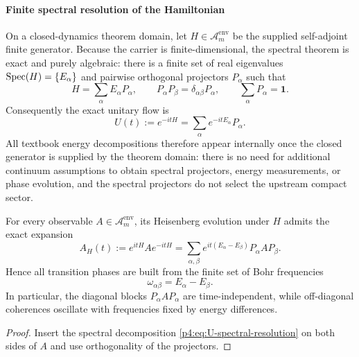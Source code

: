 \documentclass[12pt,a4paper]{article}
\begin{document}
\paragraph{Finite spectral resolution of the Hamiltonian}
\label{p4:sec:part2-spectral-resolution}

On a closed-dynamics theorem domain, let $H\in\mathcal A_m^{\mathrm{env}}$ be the supplied self-adjoint finite generator.
Because the carrier is finite-dimensional, the spectral theorem is exact and purely algebraic: there is a finite set of real eigenvalues $\operatorname{Spec}(H)=\{E_\alpha\}$ and pairwise orthogonal projectors $P_\alpha$ such that
\begin{equation}
\label{p4:eq:H-spectral-resolution}
H=\sum_{\alpha} E_\alpha P_\alpha,
\qquad
P_\alpha P_\beta=\delta_{\alpha\beta}P_\alpha,
\qquad
\sum_\alpha P_\alpha=\mathbf 1.
\end{equation}
Consequently the exact unitary flow is
\begin{equation}
\label{p4:eq:U-spectral-resolution}
U(t):=e^{-itH}=\sum_\alpha e^{-itE_\alpha}P_\alpha.
\end{equation}
All textbook energy decompositions therefore appear internally once the closed generator is supplied by the theorem domain: there is no need for additional continuum assumptions to obtain spectral projectors, energy measurements, or phase evolution, and the spectral projectors do not select the upstream compact sector.


\begin{theorem}
\label{p4:thm:finite-spectral-evolution}
For every observable $A\in\mathcal A_m^{\mathrm{env}}$, its Heisenberg evolution under $H$ admits the exact expansion
\begin{equation}
\label{p4:eq:A-heis-bohr}
A_H(t):=e^{itH}Ae^{-itH}=\sum_{\alpha,\beta} e^{it(E_\alpha-E_\beta)}P_\alpha A P_\beta.
\end{equation}
Hence all transition phases are built from the finite set of Bohr frequencies
\begin{equation}
\label{p4:eq:bohr-frequencies}
\omega_{\alpha\beta}=E_\alpha-E_\beta.
\end{equation}
In particular, the diagonal blocks $P_\alpha A P_\alpha$ are time-independent, while off-diagonal coherences oscillate with frequencies fixed by energy differences.
\end{theorem}


\begin{proof}
Insert the spectral decomposition \eqref{p4:eq:U-spectral-resolution} on both sides of $A$ and use orthogonality of the projectors.
\end{proof}
\end{document}
